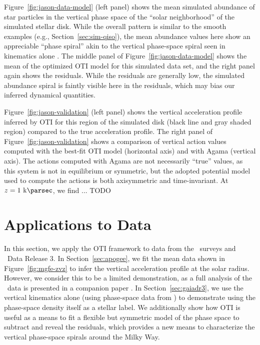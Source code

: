 Figure~\ref{fig:jason-data-model} (left panel) shows the mean simulated 
abundance of star particles in the vertical phase space of the ``solar neighborhood'' of
the simulated stellar disk.
While the overall pattern is similar to the smooth examples (e.g.,
Section~\ref{sec:sim-qiso}), the mean abundance values here show an appreciable ``phase
spiral'' akin to the vertical phase-space spiral seen in kinematics alone
\citep{Antoja:2018}.
The middle panel of Figure~\ref{fig:jason-data-model} shows the mean  of
the optimized OTI model for this simulated data set, and the right panel again shows the
residuals.
While the residuals are generally low, the simulated abundance spiral is faintly visible
here in the residuals, which may bias our inferred dynamical quantities.

Figure~\ref{fig:jason-validation} (left panel) shows the vertical acceleration profile
inferred by OTI for this region of the simulated disk (black line and gray shaded
region) compared to the true acceleration profile.
The right panel of Figure~\ref{fig:jason-validation} shows a comparison of vertical
action values computed with the best-fit OTI model (horizontal axis) and with Agama
(vertical axis).
The actions computed with Agama are not necessarily ``true'' values, as this system is
not in equilibrium or symmetric, but the adopted potential model used to compute the
actions is both axisymmetric and time-invariant. 
At $z=1~\kpc$, we find ... TODO




\section{Applications to Data} \label{sec:applications-data}

In this section, we apply the OTI framework to data from the \apogee\ surveys and \gaia\
Data Release 3.
In Section~\ref{sec:apogee}, we fit the mean  data shown in
Figure~\ref{fig:mgfe-zvz} to infer the vertical acceleration profile at the solar
radius.
However, we consider this to be a limited demonstration, as a full analysis of the
\apogee\ data is presented in a companion paper \citep{Horta:2023}.
In Section~\ref{sec:gaiadr3}, we use the vertical kinematics alone (using phase-space
data from \gaia) to demonstrate using the phase-space density itself as a stellar label.
We additionally show how OTI is useful as a means to fit a flexible but symmetric model
of the phase space to subtract and reveal the residuals, which provides a new means to
characterize the vertical phase-space spirals around the Milky Way.

